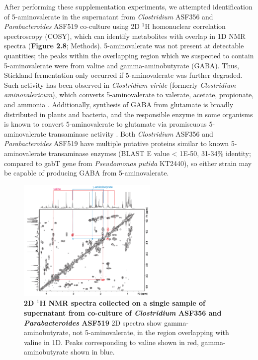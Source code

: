 \documentclass[11pt,onecolumn,notitlepage,openany,twoside]{book}
\begin{document}
\begin{refsection}
After performing these supplementation experiments, we attempted identification of 5-aminovalerate in the supernatant from \textit{Clostridium} ASF356 and \textit{Parabacteroides} ASF519 co-culture using 2D $^1\!$H homonuclear correlation spectroscopy (COSY), which can identify metabolites with overlap in 1D NMR spectra (\textbf{Figure 2.8}; Methods). 5-aminovalerate was not present at detectable quantities; the peaks within the overlapping region which we suspected to contain 5-aminovalerate were from valine and gamma-aminobutyrate (GABA). Thus, Stickland fermentation only occurred if 5-aminovalerate was further degraded. Such activity has been observed in \textit{Clostridium viride} (formerly \textit{Clostridium aminovalericum}), which converts 5-aminovalerate to valerate, acetate, propionate, and ammonia \cite{Barker1985-rs,Barker1987-jt}. Additionally, synthesis of GABA from glutamate is broadly distributed in plants and bacteria, and the responsible enzyme in some organisms is known to convert 5-aminovalerate to glutamate via promiscuous 5-aminovalerate transaminase activity \cite{Shin2016-vy,Yonaha1985-xp}. Both \textit{Clostridium} ASF356 and \textit{Parabacteroides} ASF519 have multiple putative proteins similar to known 5-aminovalerate transaminase enzymes (BLAST E value \textless\! 1E-50, 31-34\% identity; compared to gabT gene from \textit{Pseudomonas putida} KT2440), so either strain may be capable of producing GABA from 5-aminovalerate.

\begin{figure}[tb]
\centering
\includegraphics[width=0.6\textwidth]{ch2_figS5}
\caption[2D $^1\!$H NMR spectra collected on a single sample of supernatant from co-culture of \textit{Clostridium} ASF356 and \textit{Parabacteroides} ASF519]{\textbf{2D $^1\!$H NMR spectra collected on a single sample of supernatant from co-culture of \textit{Clostridium} ASF356 and \textit{Parabacteroides} ASF519} 2D spectra show gamma-aminobutyrate, not 5-aminovalerate, in the region overlapping with valine in 1D. Peaks corresponding to valine shown in red, gamma-aminobutyrate shown in blue.}
\end{figure}


\end{refsection}
\end{document}
